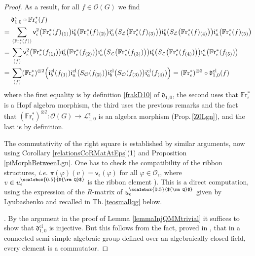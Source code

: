 \documentclass[11pt]{amsart}
\newcommand{\e}{\epsilon}
\newcommand{\Q}{{\scalebox{0.5}{${\rm Q}$}}}
\begin{document}
\begin{proof}
\noindent As a result, for all $f \in \mathcal{O}(G)$ we find
\begin{align*}
&\mathfrak{d}_{1,0}^{\e} \circ \mathbb{F}\mathrm{r}_\e^*(f)\\
=\:& \sum_{(\mathbb{F}\mathrm{r}_\e^*(f))} \mathsf{v}_{\e}^2\bigl( \mathbb{F}\mathrm{r}_\e^*(f)_{(1)} \bigr) \mathfrak{i}^{\e}_b\bigl( \mathbb{F}\mathrm{r}_\e^*(f)_{(2)} \bigr) \mathfrak{i}^{\e}_a\bigl( S_{\mathcal{L}}\bigl(\mathbb{F}\mathrm{r}_\e^*(f)_{(3)} \bigr)\bigr)  \mathfrak{i}^{\e}_b\bigl( S_{\mathcal{L}}\bigl(\mathbb{F}\mathrm{r}_\e^*(f)_{(4)} \bigr)\bigr) \mathfrak{i}^{\e}_a\bigl( \mathbb{F}\mathrm{r}_\e^*(f)_{(5)} \bigr)\\
=\:& \sum_{(f)} \mathsf{v}_{\e}^2\bigl( \mathbb{F}\mathrm{r}_\e^*(f_{(1)}) \bigr) \mathfrak{i}^{\e}_b\bigl( \mathbb{F}\mathrm{r}_\e^*(f_{(2)}) \bigr) \mathfrak{i}^{\e}_a\bigl( S_{\mathcal{L}}\bigl(\mathbb{F}\mathrm{r}_\e^*(f_{(3)}) \bigr)\bigr)  \mathfrak{i}^{\e}_b\bigl( S_{\mathcal{L}}\bigl(\mathbb{F}\mathrm{r}_\e^*(f_{(4)}) \bigr)\bigr) \mathfrak{i}^{\e}_a\bigl( \mathbb{F}\mathrm{r}_\e^*(f_{(5)}) \bigr)\\
=\:& \sum_{(f)} (\mathbb{F}\mathrm{r}_\e^*)^{\otimes 2} \Bigl( \mathfrak{i}^{\mathrm{cl}}_b(f_{(1)}) \mathfrak{i}^{\mathrm{cl}}_a\bigl( S_{\mathcal{O}}(f_{(2)}) \bigr)  \mathfrak{i}^{\mathrm{cl}}_b\bigl( S_{\mathcal{O}}(f_{(3)}) \bigr) \mathfrak{i}^{\mathrm{cl}}_a(f_{(4)}) \Bigr)= (\mathbb{F}\mathrm{r}_\e^*)^{\otimes 2} \circ \mathfrak{d}_{1,0}^{\mathrm{cl}}(f)
\end{align*}
where the first equality is by definition \eqref{frakD10} of $\mathfrak{d}_{1,0}$, the second uses that $\mathbb{F}\mathrm{r}_\e^*$ is a Hopf algebra morphism, the third uses the previous remarks and the fact that $(\mathbb{F}\mathrm{r}_\e^*)^{\otimes 2} : \mathcal{O}(G) \to \mathcal{L}_{1,0}^\e$ is an algebra morphism (Prop.\,\ref{Z0Lgn}), and the last is by definition. 

The commutativity of the right square is established by similar arguments, now using Corollary \ref{relationsCoRMatAtEps}(1) and Proposition \ref{piMorphBetweenLgn}. One has to check the compatibility of the ribbon structures, {\it i.e.} $\pi(\varphi)(v) = \mathsf{v}_{\e}(\varphi)$ for all $\varphi \in \mathcal{O}_\e$, where $v \in u_\e^\Q$ is the ribbon element \cite[eq. (A.3.1)]{Lyub95}). This is a direct computation, using the expression of the $R$-matrix of $u_\e^\Q$ given by Lyubashenko \cite[App.]{Lyub95} and recalled in Th.\,\ref{teosmallqg} below.

. By the argument in the proof of Lemma \ref{lemmaInjQMMtrivial} it suffices to show that $\mathfrak{d}_{1,0}^{\mathrm{cl}}$ is injective. But this follows from the fact, proved in \cite{Ree}, that in a connected semi-simple algebraic group defined over an algebraically closed field, every element is a commutator.


\end{proof}
\end{document}
